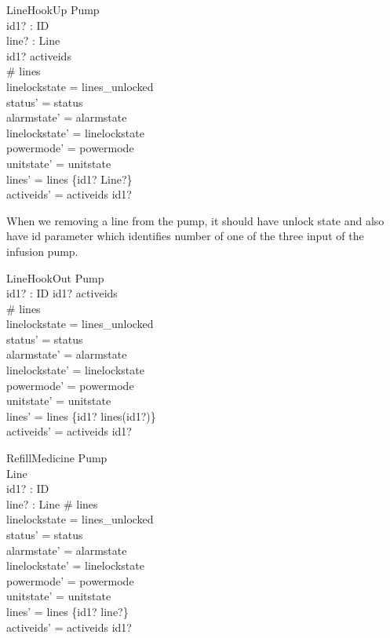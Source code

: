 \documentclass{article}
\begin{document}
	\begin{schema}{LineHookUp}
		\Delta Pump \\
		id1? : ID \\
		line? : Line \\
	\where
		id1? \notin activeids \\
		\# lines  \\
		linelockstate = lines\_unlocked \\
		status' = status \\
		alarmstate' = alarmstate \\
		linelockstate' = linelockstate \\
		powermode' =  powermode \\
		unitstate' = unitstate \\
		lines' = lines \cup \{id1? \mapsto Line?\} \\
		activeids' = activeids \cup id1?
	\end{schema}

	When we removing a line from the pump, it should have unlock state
	and also have id parameter which identifies number of one of the
	three input of the infusion pump.
	
	\begin{schema}{LineHookOut}
		\Delta Pump \\
		id1? : ID
	\where
		id1? \in activeids \\
		\# lines  \\
		linelockstate = lines\_unlocked \\
		status' = status \\
		alarmstate' = alarmstate \\
		linelockstate' = linelockstate \\
		powermode' =  powermode \\
		unitstate' = unitstate \\
		lines' = lines \setminus \{id1? \mapsto lines(id1?)\} \\
		activeids' = activeids \setminus id1?
	\end{schema}
	
	\begin{schema}{RefillMedicine}
		\Delta Pump \\
		\Delta Line \\
		id1? : ID \\
		line? : Line
	\where
		\# lines  \\
		linelockstate = lines_unlocked \\
		status' = status \\
		alarmstate' = alarmstate \\
		linelockstate' = linelockstate \\
		powermode' =  powermode \\
		unitstate' = unitstate \\
		lines' = lines \setminus \{id1? \mapsto line?\} \\
		activeids' = activeids \setminus id1?
	\end{schema}
	
\end{document}

